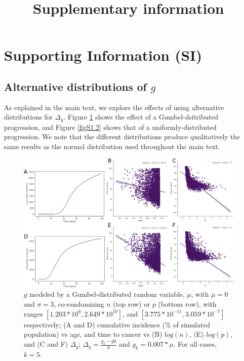 \documentclass[9pt,twocolumn,twoside]{pnas-new}
\title{Supplementary information}
\begin{document}
\section*{Supporting Information (SI)}
	\renewcommand{\thesubsection}{S\arabic{subsection}}
	\setcounter{subsection}{0} 	

	\subsection{Alternative distributions of $g$}\label{S1 Figures}
		As explained in the main text, we explore the effects of using alternative distributions for $\Delta_{g}$. Figure \ref{figS1.1} shows the effect of a Gumbel-dsitributed progression, and Figure \ref{figS1.2} shows that of a uniformly-distributed progression. We note that the different distributions produce qualitatively the same results as the normal distribution used throughout the main text.

		\renewcommand{\thefigure}{S1.\arabic{figure}}
		\setcounter{figure}{0} 	
		\begin{figure}[tbhp]
			\centering
			\includegraphics[width=\linewidth, keepaspectratio=true]{figS1-1.png}
			\caption{$g$ modeled by a Gumbel-distributed random variable, $\mu$, with $\overline{\mu}=0$ and $\sigma=3$, co-randomizing $n$ (top row) or $p$ (bottom row), with ranges $[1.203*10^{6}, 2.649*10^{10}]$, and $[3.775*10^{-11}, 3.059*10^{-7}]$ respectively; (A and D) cumulative incidence (\% of simulated population) vs age, and time to cancer vs (B) $log(n)$, (E) $log(p)$, and (C and F) $\Delta_{g}$; $\Delta_{g} = \frac{g_{k}-g{0}}{k}$ and $g_{k} = 0.007*\mu$. For all cases, $k=5$.}
			\label{figS1.1}
		\end{figure}
\end{document}
